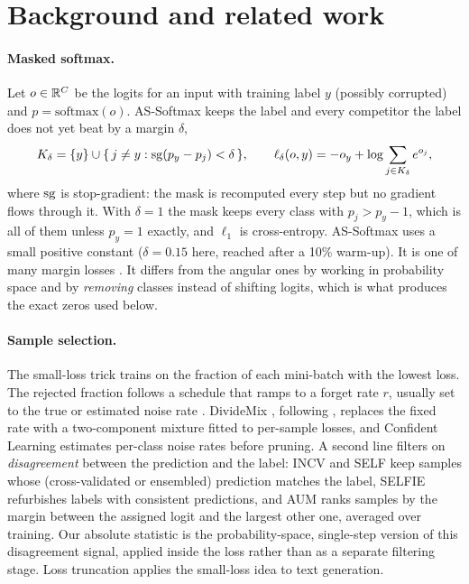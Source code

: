 \section{Background and related work}
\label{sec:background}

\paragraph{Masked softmax.}
Let $o \in \mathbb{R}^C$ be the logits for an input with training label $y$ (possibly corrupted) and
$p = \mathrm{softmax}(o)$. AS-Softmax \citep{lv2023assoftmax} keeps the label and every competitor
the label does not yet beat by a margin $\delta$,
\begin{equation}
  K_\delta = \{y\} \cup \{\, j \ne y : \operatorname{sg}(p_y - p_j) < \delta \,\},
  \qquad
  \ell_\delta(o, y) = -o_y + \log \sum_{j \in K_\delta} e^{o_j},
  \label{eq:masked}
\end{equation}
where $\operatorname{sg}$ is stop-gradient: the mask is recomputed every step but no gradient flows through
it. With $\delta = 1$ the mask keeps every class with $p_j > p_y - 1$, which is all of them
unless $p_y = 1$ exactly, and $\ell_1$ is cross-entropy. AS-Softmax uses a small positive
constant ($\delta = 0.15$ here, reached after a 10\% warm-up). It is one of many margin losses
\citep{liu2016lsoftmax,wang2018amsoftmax,cao2019ldam}. It differs from the angular ones by
working in probability space and by \emph{removing} classes instead of shifting logits, which is
what produces the exact zeros used below.

\paragraph{Sample selection.}
The small-loss trick trains on the fraction of each mini-batch with the lowest loss. The rejected
fraction follows a schedule that ramps to a forget rate $r$, usually set to the true or estimated
noise rate \citep{jiang2018mentornet,han2018coteaching,yu2019coteachingplus,wei2020jocor}.
DivideMix \citep{li2020dividemix}, following \citet{arazo2019unsupervised}, replaces the fixed rate
with a two-component mixture fitted to per-sample losses, and Confident Learning
\citep{northcutt2021confident} estimates per-class noise rates before pruning. A second line filters
on \emph{disagreement} between the prediction and the label: INCV \citep{chen2019understanding} and
SELF \citep{nguyen2020self} keep samples whose (cross-validated or ensembled) prediction matches the
label, SELFIE \citep{song2019selfie} refurbishes labels with consistent predictions, and AUM
\citep{pleiss2020aum} ranks samples by the margin between the assigned logit and the largest other
one, averaged over training. Our absolute statistic is the probability-space, single-step version
of this disagreement signal, applied inside the loss rather than as a separate filtering stage.
Loss truncation \citep{kang2020losstruncation} applies the small-loss idea to text generation.

